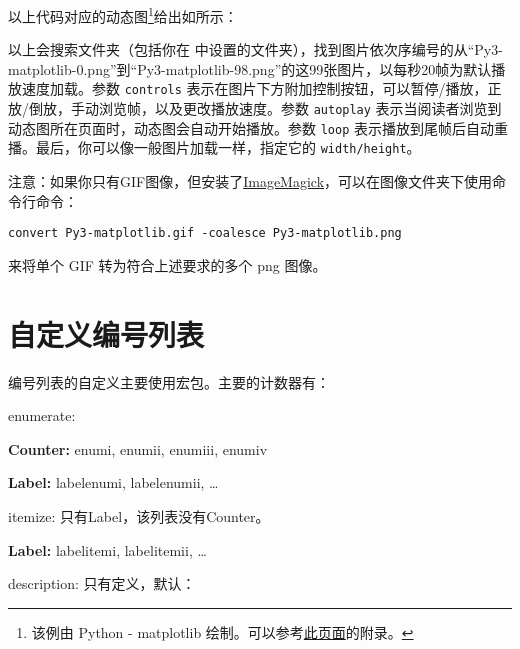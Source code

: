 以上代码对应的动态图\footnote{该例由 Python - matplotlib 绘制。可以参考\href{https://wklchris.github.io/Py3-matplotlib.html}{此页面}的附录。}给出如所示：
\begin{figure}[!hbt]
  \centering
\end{figure}

以上会搜索文件夹（包括你在  中设置的文件夹），找到图片依次序编号的从“Py3-matplotlib-0.png”到“Py3-matplotlib-98.png”的这99张图片，以每秒20帧为默认播放速度加载。参数 \texttt{controls} 表示在图片下方附加控制按钮，可以暂停/播放，正放/倒放，手动浏览帧，以及更改播放速度。参数 \texttt{autoplay} 表示当阅读者浏览到动态图所在页面时，动态图会自动开始播放。参数 \texttt{loop} 表示播放到尾帧后自动重播。最后，你可以像一般图片加载一样，指定它的 \texttt{width/height}。

注意：如果你只有GIF图像，但安装了\href{https://www.imagemagick.org/script/download.php}{ImageMagick}，可以在图像文件夹下使用命令行命令：

\begin{verbatim}
convert Py3-matplotlib.gif -coalesce Py3-matplotlib.png
\end{verbatim}

来将单个 GIF 转为符合上述要求的多个 png 图像。

\section{自定义编号列表}
\label{sec:list}
编号列表的自定义主要使用宏包。主要的计数器有：
\begin{feai}
\item enumerate:
  \begin{feai}
    \item \textbf{Counter:} enumi, enumii, enumiii, enumiv
    \item \textbf{Label:} labelenumi, labelenumii, \ldots
  \end{feai}
\item itemize: 只有Label，该列表没有Counter。 
  \begin{feai}
    \item \textbf{Label:} labelitemi, labelitemii, \ldots
  \end{feai}
\item description: 只有定义，默认：
\begin{latex}
\newcommand*{\descriptionlabel}[1]{\hspace\labelsep
    \normalfont\bfseries #1} %
\end{latex}
\end{feai}

